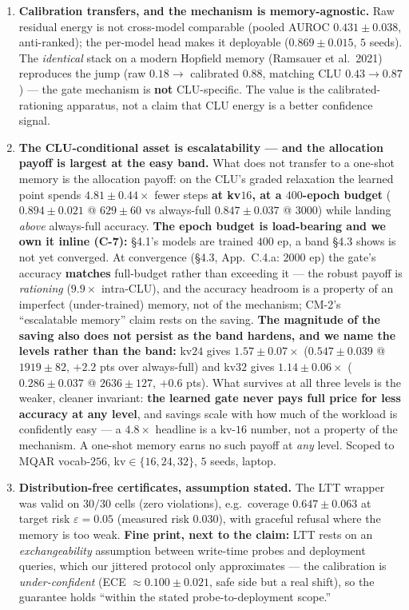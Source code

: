 \documentclass[11pt]{article}
\begin{document}
\begin{enumerate}\itemsep2pt
\item \textbf{Calibration transfers, and the mechanism is memory-agnostic.} Raw residual energy is not cross-model comparable (pooled AUROC $0.431\pm0.038$, anti-ranked); the per-model head makes it deployable ($0.869\pm0.015$, $5$ seeds). The \emph{identical} stack on a modern Hopfield memory (Ramsauer et al.\ 2021) reproduces the jump (raw $0.18\to$ calibrated $0.88$, matching CLU $0.43\to0.87$) --- the gate mechanism is \textbf{not} CLU-specific. The value is the calibrated-rationing apparatus, not a claim that CLU energy is a better confidence signal.
\item \textbf{The CLU-conditional asset is escalatability --- and the allocation payoff is largest at the easy band.} What does not transfer to a one-shot memory is the allocation payoff: on the CLU's graded relaxation the learned point spends $4.81\pm0.44\times$ fewer steps \textbf{at kv$16$, at a $400$-epoch budget} ($0.894\pm0.021$ @ $629\pm60$ vs always-full $0.847\pm0.037$ @ $3000$) while landing \emph{above} always-full accuracy. \textbf{The epoch budget is load-bearing and we own it inline (C-7):} \S4.1's models are trained $400$ ep, a band \S4.3 shows is not yet converged. At convergence (\S4.3, App.~C.4.a: $2000$ ep) the gate's accuracy \textbf{matches} full-budget rather than exceeding it --- the robust payoff is \emph{rationing} ($9.9\times$ intra-CLU), and the accuracy headroom is a property of an imperfect (under-trained) memory, not of the mechanism; CM-2's ``escalatable memory'' claim rests on the saving. \textbf{The magnitude of the saving also does not persist as the band hardens, and we name the levels rather than the band:} kv$24$ gives $1.57\pm0.07\times$ ($0.547\pm0.039$ @ $1919\pm82$, $+2.2$ pts over always-full) and kv$32$ gives $1.14\pm0.06\times$ ($0.286\pm0.037$ @ $2636\pm127$, $+0.6$ pts). What survives at all three levels is the weaker, cleaner invariant: \textbf{the learned gate never pays full price for less accuracy at any level}, and savings scale with how much of the workload is confidently easy --- a $4.8\times$ headline is a kv-$16$ number, not a property of the mechanism. A one-shot memory earns no such payoff at \emph{any} level. Scoped to MQAR vocab-$256$, kv$\in\{16,24,32\}$, $5$ seeds, laptop.
\item \textbf{Distribution-free certificates, assumption stated.} The LTT wrapper was valid on $30/30$ cells (zero violations), e.g.\ coverage $0.647\pm0.063$ at target risk $\varepsilon=0.05$ (measured risk $0.030$), with graceful refusal where the memory is too weak. \textbf{Fine print, next to the claim:} LTT rests on an \emph{exchangeability} assumption between write-time probes and deployment queries, which our jittered protocol only approximates --- the calibration is \emph{under-confident} (ECE $\approx0.100\pm0.021$, safe side but a real shift), so the guarantee holds ``within the stated probe-to-deployment scope.''
\end{enumerate}
\end{document}
